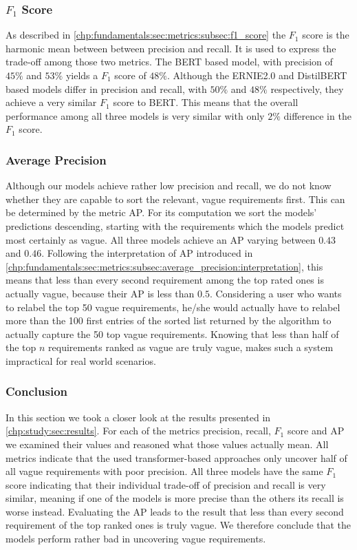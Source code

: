 \subsubsection{$F_1$ Score}
\label{chp:study:sec:interpretation:subsec:discussion:f1_score}
As described in \cref{chp:fundamentals:sec:metrics:subsec:f1_score} the $F_1$ score is the harmonic mean between between precision and recall.
It is used to express the trade-off among those two metrics.
The \ac{BERT} based model, with precision of $45\%$ and $53\%$ yields a $F_1$ score of $48\%$.
Although the \ac{ERNIE2.0} and \ac{DistilBERT} based models differ in precision and recall, with $50\%$ and $48\%$ respectively, they achieve a very similar $F_1$ score to \ac{BERT}.
This means that the overall performance among all three models is very similar with only $2\%$ difference in the $F_1$ score.

\subsubsection{Average Precision}
\label{chp:study:sec:interpretation:subsec:discussion:average_precision}
Although our models achieve rather low precision and recall, we do not know whether they are capable to sort the relevant, vague requirements first.
This can be determined by the metric \ac{AP}.
For its computation we sort the models' predictions descending, starting with the requirements which the models predict most certainly as vague.
All three models achieve an \ac{AP} varying between $0.43$ and $0.46$.
Following the interpretation of \ac{AP} introduced in \cref{chp:fundamentals:sec:metrics:subsec:average_precision:interpretation}, this means that less than every second requirement among the top rated ones is actually vague, because their \ac{AP} is less than $0.5$.
Considering a user who wants to relabel the top 50 vague requirements, he/she would actually have to relabel more than the 100 first entries of the sorted list returned by the algorithm to actually capture the 50 top vague requirements.
Knowing that less than half of the top $n$ requirements ranked as vague are truly vague, makes such a system impractical for real world scenarios.

\subsubsection{Conclusion}
\label{chp:study:sec:interpretation:subsec:discussion:usability}
In this section we took a closer look at the results presented in \cref{chp:study:sec:results}.
For each of the metrics precision, recall, $F_1$ score and \ac{AP} we examined their values and reasoned what those values actually mean.
All metrics indicate that the used transformer-based approaches only uncover half of all vague requirements with poor precision.
All three models have the same $F_1$ score indicating that their individual trade-off of precision and recall is very similar, meaning if one of the models is more precise than the others its recall is worse instead.
Evaluating the \ac{AP} leads to the result that less than every second requirement of the top ranked ones is truly vague.
We therefore conclude that the models perform rather bad in uncovering vague requirements.
